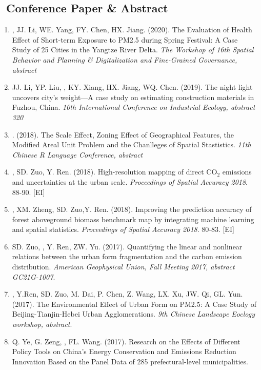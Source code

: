 \subsection*{\texorpdfstring{\faBook\ Conference Paper \& Abstract}{Conference Paper \& Abstract}}
\begin{enumerate}
\item
    \Shaoqing, JJ. Li, WE. Yang, FY. Chen, HX. Jiang. (2020).
    The Evaluation of Health Effect of Short-term Exposure to PM2.5 during Spring Festival: A Case Study of 25 Cities in the Yangtze River Delta.
    \textit{The Workshop of 16th Spatial Behavior and Planning \& Digitalization and Fine-Grained Governance, abstract}
\item
    JJ. Li, YP. Liu, \Shaoqing, KY. Xiang, HX. Jiang, WQ. Chen. (2019).
    The night light uncovers city’s weight—A case study on estimating construction materials in Fuzhou, China.
    \textit{10th International Conference on Industrial Ecology, abstract 320}
\item
    \Shaoqing. (2018).
    The Scale Effect, Zoning Effect of Geographical Features, the Modified Areal Unit Problem and the Chanlleges of Spatial Stastistics.
    \textit{11th Chinese R Language Conference, abstract}
\item
    \Shaoqing, SD. Zuo, Y. Ren. (2018).
    High-resolution mapping of direct CO$_2$ emissions and uncertainties at the urban scale.
    \textit{Proceedings of Spatial Accuracy 2018}. 88-90. [EI]
\item
    \Shaoqing\CF, XM. Zheng, SD. Zuo,Y. Ren. (2018).
    Improving the prediction accuracy of forest aboveground biomass benchmark map by integrating machine learning and spatial statistics.
    \textit{Proceedings of Spatial Accuracy 2018}. 80-83. [EI]
\item
    SD. Zuo, \Shaoqing, Y. Ren, ZW. Yu. (2017).
    Quantifying the linear and nonlinear relations between the urban form fragmentation and the carbon emission distribution.
    \textit{American Geophysical Union, Fall Meeting 2017, abstract GC21G-1007}.
\item
    \Shaoqing, Y.Ren, SD. Zuo, M. Dai, P. Chen, Z. Wang, LX. Xu, JW. Qi, GL. Yun. (2017).
    The Environmental Effect of Urban Form on PM2.5: A Case Study of Beijing-Tianjin-Hebei Urban Agglomerations.
    \textit{9th Chinese Landscape Eoclogy workshop, abstract}.
\item
    Q. Ye, G. Zeng, \Shaoqing, FL. Wang. (2017).
    Research on the Effects of Different Policy Tools on China’s Energy Conservation and Emissions Reduction Innovation Based on the Panel Data of 285 prefectural-level municipalities.

\end{enumerate}
